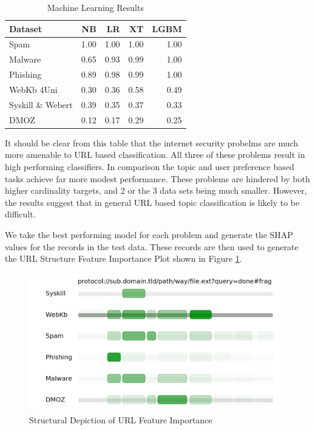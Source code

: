 \documentclass[sigconf]{acmart}
\begin{document}
\begin{table}
\caption{Machine Learning Results}
\label{tab:results}
\begin{tabular}{|l|r|r|r|r|}
\toprule
Dataset              &NB     &LR    &XT    &LGBM     \\
\midrule
Spam                 &1.00   &1.00  &1.00  &1.00     \\
Malware              &0.65   &0.93  &0.99  &1.00     \\
Phishing             &0.89   &0.98  &0.99  &1.00     \\
WebKb 4Uni           &0.30   &0.36  &0.58  &0.49     \\
Syskill \& Webert    &0.39   &0.35  &0.37  &0.33     \\
DMOZ                 &0.12   &0.17  &0.29  &0.25     \\
\bottomrule
\end{tabular}
\end{table}

It should be clear from this table that the internet security probelms are much more amenable to URL based 
classification. All three of these problems result in high performing classifiers. In comparison the topic
and user preference based tasks achieve far more modest performance. These problems are hindered by both higher 
cardinality targets, and 2 or the 3 data sets being much smaller. However, the results suggest that in general
URL based topic classification is likely to be difficult. 

We take the best performing model for each problem and generate the SHAP values for the records in the test data.
These records are then used to generate the URL Structure Feature Importance Plot shown in Figure \ref{fig:importance}. 

\begin{figure}
\centering
\includegraphics[scale=0.8]{images/URL_importance.png}
\caption{Structural Depiction of URL Feature Importance}
\label{fig:importance}
\end{figure}
\end{document}
